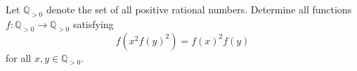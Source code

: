 Let $\mathbb{Q}_{>0}$ denote the set of all positive rational numbers. Determine all functions $f\colon \mathbb{Q}_{>0} \to \mathbb{Q}_{>0}$ satisfying
\[
f\left(x^2 f(y)^2\right) = f(x)^2 f(y)
\tag{$*$}
\]
for all $x, y \in \mathbb{Q}_{>0}$.
